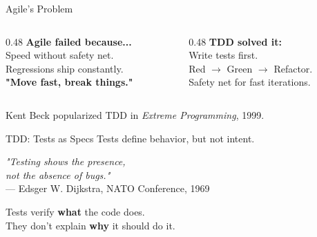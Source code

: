 \documentclass[aspectratio=169,18pt]{beamer}
\begin{document}
\begin{frame}{Agile's Problem}
  \vspace{0.3em}
  \begin{columns}[T]
    \begin{column}{0.48\textwidth}
      \textbf{\color{openred}Agile failed because...}\\[0.6em]
      \normalsize
      Speed without safety net.\\[0.4em]
      Regressions ship constantly.\\[0.4em]
      \textbf{"Move fast, break things."}
    \end{column}
    \begin{column}{0.48\textwidth}
      \textbf{\color{opengreen}TDD solved it:}\\[0.6em]
      \normalsize
      Write tests first.\\[0.4em]
      Red $\to$ Green $\to$ Refactor.\\[0.4em]
      Safety net for fast iterations.
    \end{column}
  \end{columns}
  \vspace{1em}
  \small\color{opengray}Kent Beck popularized TDD in \textit{Extreme Programming}, 1999.
\end{frame}

\begin{frame}{TDD: Tests as Specs}
  \vspace{0.5em}
  \large Tests define behavior, but not intent.\\[1.5em]
  \begin{center}
    \large\textit{"Testing shows the presence,\\
    not the absence of bugs."}\\[0.8em]
    \normalsize\color{opengray}— Edsger W. Dijkstra, NATO Conference, 1969
  \end{center}
  \vspace{1em}
  \normalsize
  Tests verify \textbf{what} the code does.\\
  They don't explain \textbf{why} it should do it.
\end{frame}
\end{document}
